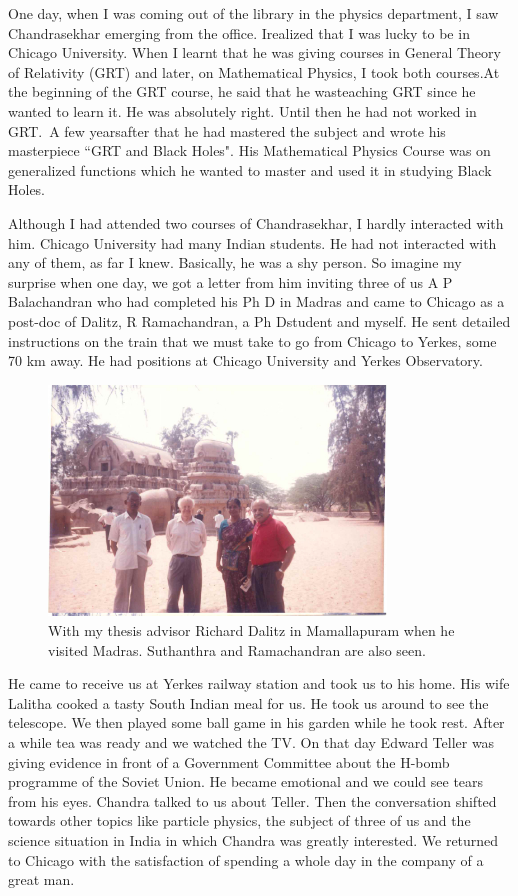 One day, when I was coming out of the library in the physics department, 
I saw Chandrasekhar emerging from the office. I\break realized that I was 
lucky to be in Chicago University. When I learnt that he was giving 
courses in General Theory of Relativity (GRT) and later, on Mathematical 
Physics, I took both courses.\break At the beginning of the GRT course, he 
said that he was\break teaching GRT since he wanted to learn it. He was 
absolutely right. Until\- then he had not worked in GRT.\ A few years\break after 
that he had mastered the subject and wrote his masterpiece ``GRT and 
Black Holes". His Mathematical Physics Course was on genera\-lized 
functions which he wanted to master and used it in studying Black Holes.

Although I had attended two courses of Chandrasekhar, I hardly 
interacted with him. Chicago University had many Indian\- students. He had 
not interacted with any of them, as far I knew. Basically, he was a shy 
person. So imagine my surprise when one day, we got a letter from him 
inviting three of us A P Bala\-chandran who had completed his Ph D in 
Madras and came to Chicago as a post-doc of Dalitz, R Ramachandran, a Ph 
D\break student and myself. He sent detailed instructions on the train that we 
must take to go from Chicago to Yerkes, some 70 km away. He had 
positions at Chicago University and Yerkes Observatory.

\begin{figure}[H]
\centering
\includegraphics[width=0.8\textwidth]{images/new-images/07-Rajaji-Dalitz.jpg}
\caption{\small{With my thesis advisor Richard Dalitz in Mamalla\-puram when he visited Madras. Suthanthra and Ramachandran are also seen.}}
\end{figure}

He came to receive us at Yerkes railway station and took us to his home. 
His wife Lalitha cooked a tasty South Indian meal for us. He took us 
around to see the telescope. We then played some ball game in his garden 
while he took rest. After a while tea was ready and we watched the TV. 
On that day Edward Teller was giving evidence in front of a Government 
Committee about the H-bomb programme of the Soviet Union. He became 
emotional and we could see tears from his eyes. Chandra talked to us 
about Teller. Then the conversation shifted towards other topics like 
particle physics, the subject of three of us and the science situation 
in India in which Chandra was greatly interested. We returned to Chicago 
with the satisfaction of spending a whole day in the company of a great 
man.

